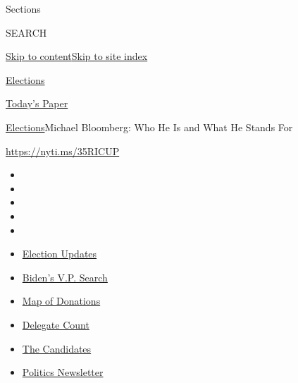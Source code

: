 Sections

SEARCH

\protect\hyperlink{site-content}{Skip to
content}\protect\hyperlink{site-index}{Skip to site index}

\href{https://www.nytimes.com/news-event/2020-election}{Elections}

\href{https://myaccount.nytimes.com/auth/login?response_type=cookie\&client_id=vi}{}

\href{https://www.nytimes.com/section/todayspaper}{Today's Paper}

\href{/news-event/2020-election}{Elections}\textbar{}Michael Bloomberg:
Who He Is and What He Stands For

\url{https://nyti.ms/35RICUP}

\begin{itemize}
\item
\item
\item
\item
\item
\end{itemize}

\begin{itemize}
\item
  \href{https://www.nytimes.com/2020/07/31/us/elections/biden-vs-trump.html?action=click\&pgtype=Article\&state=default\&region=TOP_BANNER\&context=storylines_menu}{Election
  Updates}
\item
  \href{https://www.nytimes.com/article/biden-vice-president-2020.html?action=click\&pgtype=Article\&state=default\&region=TOP_BANNER\&context=storylines_menu}{Biden's
  V.P. Search}
\item
  \href{https://www.nytimes.com/interactive/2020/07/24/us/politics/trump-biden-campaign-donors.html?action=click\&pgtype=Article\&state=default\&region=TOP_BANNER\&context=storylines_menu}{Map
  of Donations}
\item
  \href{https://www.nytimes.com/interactive/2020/us/elections/delegate-count-primary-results.html?action=click\&pgtype=Article\&state=default\&region=TOP_BANNER\&context=storylines_menu}{Delegate
  Count}
\item
  \href{https://www.nytimes.com/interactive/2019/us/politics/2020-presidential-candidates.html?action=click\&pgtype=Article\&state=default\&region=TOP_BANNER\&context=storylines_menu}{The
  Candidates}
\item
  \href{https://www.nytimes.com/newsletters/politics?action=click\&pgtype=Article\&state=default\&region=TOP_BANNER\&context=storylines_menu}{Politics
  Newsletter}
\end{itemize}

